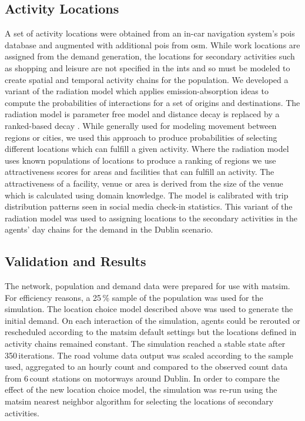 \subsection{Activity Locations}
A set of activity locations were obtained from an in-car navigation system’s \glspl{poi} database and augmented with additional \glspl{poi} from \gls{osm}. While work locations are assigned from the demand generation, the locations for secondary activities such as shopping and leisure are not specified in the \gls{ints} and so must be modeled to create spatial and temporal activity chains for the population. We developed a variant of the radiation model which applies emission-absorption ideas to compute the probabilities of interactions for a set of origins and destinations. The radiation model is parameter free model and distance decay is replaced by a ranked-based decay \citep[][]{SiminiEtAl_NAT_2012}. While generally used for modeling movement between regions or cities, we used this approach to produce probabilities of selecting different locations which can fulfill a given activity. Where the radiation model uses known populations of locations to produce a ranking of regions we use attractiveness scores for areas and facilities that can fulfill an activity. The attractiveness of a facility, venue or area is derived from the size of the venue which is calculated using domain knowledge. The model is calibrated with trip distribution patterns seen in social media check-in statistics. This variant of the radiation model was used to assigning locations to the secondary activities in the agents’ day chains for the demand in the Dublin scenario.

\subsection{Validation and Results}
The network, population and demand data were prepared for use with \gls{matsim}. For efficiency reasons, a 25\,\% sample of the population was used for the simulation. The location choice model described above was used to generate the initial demand. On each interaction of the simulation, agents could be rerouted or rescheduled according to the \gls{matsim} default settings but the locations defined in activity chains remained constant. The simulation reached a stable state after 350\,iterations. The road volume data output was scaled according to the sample used, aggregated to an hourly count and compared to the observed count data from 6\,count stations on motorways around Dublin. In order to compare the effect of the new location choice model, the simulation was re-run using the \gls{matsim} nearest neighbor algorithm for selecting the locations of secondary activities.

